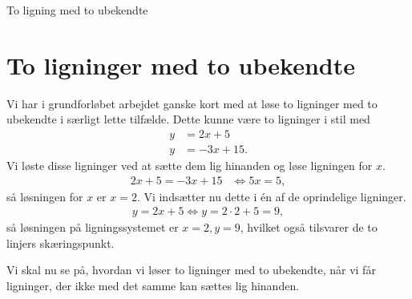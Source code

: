 \begin{center}
\Huge
To ligning med to ubekendte
\end{center}

\section*{To ligninger med to ubekendte}

Vi har i grundforløbet arbejdet ganske kort med at løse to ligninger med to ubekendte i særligt 
lette tilfælde. Dette kunne være to ligninger i stil med
\begin{align*}
	y &= 2x+5 \\
	y &= -3x+15. 
\end{align*}
Vi løste disse ligninger ved at sætte dem lig hinanden og løse ligningen for $x$. 
\begin{align*}
	2x + 5 = -3x + 15 & \Leftrightarrow 5x = 5,
\end{align*}
så løsningen for $x$ er $x = 2$. Vi indsætter nu dette i én af de oprindelige ligninger.
\begin{align*}
	y = 2x + 5 \Leftrightarrow y = 2\cdot 2 + 5 = 9,
\end{align*}
så løsningen på ligningssystemet er $x = 2, y = 9$, hvilket også tilsvarer de to linjers skæringspunkt. 

Vi skal nu se på, hvordan vi løser to ligninger med to ubekendte, når vi får ligninger, der ikke med det samme kan sættes lig hinanden. 

